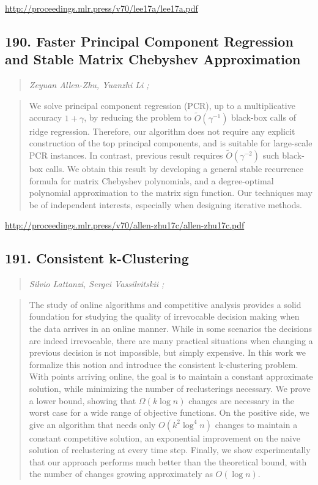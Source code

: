 \documentclass{article}
\begin{document}
\href{http://proceedings.mlr.press/v70/lee17a/lee17a.pdf}{http://proceedings.mlr.press/v70/lee17a/lee17a.pdf}

\subsection{190. Faster Principal Component Regression and Stable Matrix Chebyshev Approximation}

\begin{quote}
\footnotesize{\textit{Zeyuan Allen-Zhu, Yuanzhi Li ;}}
\end{quote}

\begin{quote}
    We solve principal component regression (PCR), up to a multiplicative accuracy $1+\gamma$, by reducing the problem to $\tilde{O}(\gamma^{-1})$ black-box calls of ridge regression. Therefore, our algorithm does not require any explicit construction of the top principal components, and is suitable for large-scale PCR instances. In contrast, previous result requires $\tilde{O}(\gamma^{-2})$ such black-box calls. We obtain this result by developing a general stable recurrence formula for matrix Chebyshev polynomials, and a degree-optimal polynomial approximation to the matrix sign function. Our techniques may be of independent interests, especially when designing iterative methods.  \end{quote}

\href{http://proceedings.mlr.press/v70/allen-zhu17c/allen-zhu17c.pdf}{http://proceedings.mlr.press/v70/allen-zhu17c/allen-zhu17c.pdf}

\subsection{191. Consistent k-Clustering}

\begin{quote}
\footnotesize{\textit{Silvio Lattanzi, Sergei Vassilvitskii ;}}
\end{quote}

\begin{quote}
    The study of online algorithms and competitive analysis provides a solid foundation for studying the quality of irrevocable decision making when the data arrives in an online manner. While in some scenarios the decisions are indeed irrevocable, there are many practical situations when changing a previous decision is not impossible, but simply expensive. In this work we formalize this notion and introduce the consistent k-clustering problem. With points arriving online, the goal is to maintain a constant approximate solution, while minimizing the number of reclusterings necessary. We prove a lower bound, showing that $\Omega(k \log n)$ changes are necessary in the worst case for a wide range of objective functions. On the positive side, we give an algorithm that needs only $O(k^2 \log^4n)$ changes to maintain a constant competitive solution, an exponential improvement on the naive solution of reclustering at every time step. Finally, we show experimentally that our approach performs much better than the theoretical bound, with the number of changes growing approximately as $O(\log n)$.  \end{quote}
\end{document}
